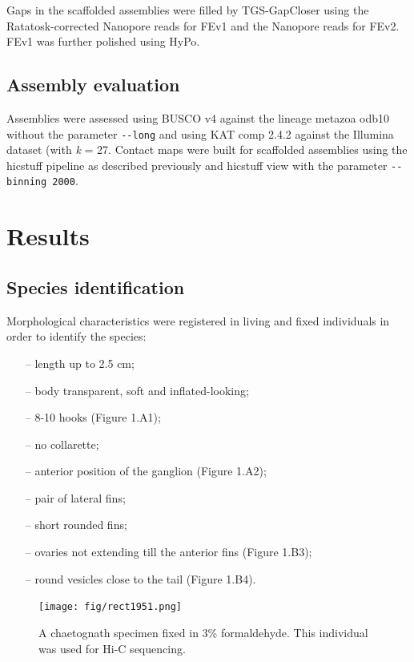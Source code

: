 Gaps in the scaffolded assemblies were filled by TGS-GapCloser \cite{tgsgapcloser} using the Ratatosk-corrected Nanopore reads for FEv1 and the Nanopore reads for FEv2. FEv1 was further polished using HyPo. 

\subsection{Assembly evaluation}

Assemblies were assessed using BUSCO v4 against the lineage metazoa odb10 without the parameter \texttt{-{}-long} and using KAT comp 2.4.2 against the Illumina dataset (with \textit{k} = 27. Contact maps were built for scaffolded assemblies using the hicstuff pipeline as described previously and hicstuff view with the parameter \texttt{-{}-binning 2000}.

\section{Results}

\subsection{Species identification}

Morphological characteristics were registered in living and fixed individuals in order to identify the species: 
\begin{itemize}
    \item[--] length up to 2.5 cm;
    \item[--] body transparent, soft and inflated-looking;
    \item[--] 8-10 hooks (Figure 1.A1);
    \item[--] no collarette;
    \item[--] anterior position of the ganglion (Figure 1.A2);
    \item[--] pair of lateral fins;
    \item[--] short rounded fins;
    \item[--] ovaries not extending till the anterior fins (Figure 1.B3);
    \item[--] round vesicles close to the tail (Figure 1.B4).
\end{itemize}

\begin{figure}[H]
    \centering
    \texttt{[image: fig/rect1951.png]}
    \caption{A chaetognath specimen fixed in 3\% formaldehyde. This individual was used for Hi-C sequencing.}
\end{figure}

